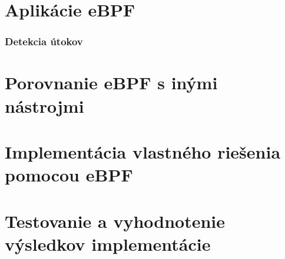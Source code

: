 \section{Aplikácie eBPF}
\subsubsection{Detekcia útokov}
\section{Porovnanie eBPF s inými nástrojmi}
\section{Implementácia vlastného riešenia pomocou eBPF}
\section{Testovanie a vyhodnotenie výsledkov implementácie}














